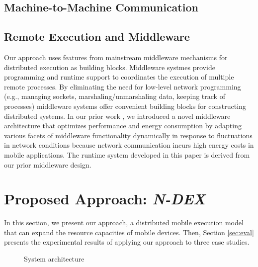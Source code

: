 \documentclass[conference]{IEEEtran}
\begin{document}
\subsection{Machine-to-Machine Communication}

\subsection{Remote Execution and Middleware}
Our approach uses features from mainstream middleware mechanisms for distributed execution as building blocks. Middleware systmes provide programming and runtime support to coordinates the execution of multiple remote processes. By eliminating the need for low-level network programming (e.g., managing sockets, marshaling/unmarshaling data, keeping track of processes) middleware systems offer convenient building blocks for constructing distributed systems. In our prior work \cite{kwon+:mobicase14-middleware}, we introduced a novel middleware architecture that optimizes performance and energy consumption by adapting various facets of middleware functionality dynamically in response to fluctuations in network conditions because network communication incurs high energy costs in mobile applications. The runtime system developed in this paper is derived from our prior middleware design.

\section{Proposed Approach: \emph{N-DEX}}
\label{sec:approach}
In this section, we present our approach, a distributed mobile execution model that can expand the resource capacities of mobile devices. Then, Section \ref{sec:eval} presents the experimental results of applying our approach to three case studies.

\begin{figure}
	\centering
	\caption{System architecture}
	\label{fig:architecture}
\end{figure}
\end{document}

